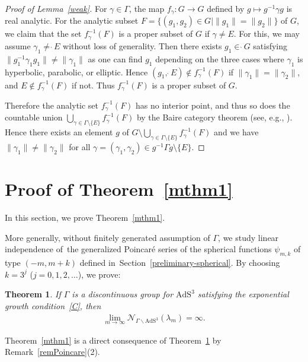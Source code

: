 \documentclass[11pt]{article}
\numberwithin{equation}{section}
\numberwithin{equation}{section}
\newtheorem{Theorem}{Theorem}[section]
\begin{document}
\begin{proof}[Proof of Lemma~\ref{weak}]
For $\gamma \in \Gamma$,
the map $f_{\gamma}\colon G \rightarrow G$ defined by $g\mapsto g^{-1}\gamma g$
is real analytic.
For the analytic subset
$F = \{(g_1,g_2) \in G
\mid \|g_1\| = \|g_2\| \}$ of $G$, we claim that
the set $f_{\gamma}^{-1}(F)$ is a proper subset of $G$ if $\gamma\neq E$.
For this, we may assume $\gamma_1 \neq \grave{\ }E$ without loss of generality.
Then there exists
$g_1 \in \grave{\ }G$ satisfying $\|g_1^{-1}\gamma_1g_1\| \neq \|
\gamma_1\|$ as one can find $g_{1}$ depending on the three cases where
$\gamma_{1}$ is hyperbolic, parabolic, or elliptic.
Hence $(g_1,\grave{\ }E)\notin f_{\gamma}^{-1}(F)$ if $\|\gamma_{1}\|=\|\gamma_{2}\|$,
and $E\notin f_{\gamma}^{-1}(F)$ if not. Thus $f_{\gamma}^{-1}(F)$ is a proper subset of $G$.

Therefore the analytic set
$f_{\gamma}^{-1}(F)$ has no interior point, and thus so does the countable union
$\bigcup_{\gamma \in \Gamma \setminus \{E\}}
 f_{\gamma}^{-1}(F)$ by the Baire category theorem
(see, e.g., \cite[Theorem~2.2]{functional-analysis}).
Hence there exists an element
$g$ of $G\setminus\bigcup_{\gamma \in \Gamma \setminus \{E\}}
 f_{\gamma}^{-1}(F)$ and we have
$\|\gamma_1\|\neq\|\gamma_2\|$
for all $\gamma=(\gamma_1,\gamma_2)\in
g^{-1}\Gamma g \setminus \{E\}$.
\end{proof}

\section{Proof of Theorem~\ref{mthm1}}\label{proof-linear-indep}
In this section, we prove Theorem~\ref{mthm1}.

More generally, without finitely generated assumption of $\Gamma$,
we study linear independence of~the generalized Poincar\'e series
of the spherical functions $\psi_{m,k}$ of type $(-m,m+k)$
defined in~Section~\ref{preliminary-spherical}.
By choosing $k=3^{j}$ ($j=0,1,2,\ldots$),
we prove:
\begin{Theorem}
\label{unbound}
If $\Gamma$ is a discontinuous group for $\mathrm{AdS}^{3}$ satisfying
the exponential growth condition~\eqref{C}, then
\begin{gather*}
\lim_{m\to\infty}\mathcal{N}_{\Gamma\backslash\mathrm{AdS}^{3}}(\lambda_{m})=\infty.
\end{gather*}
\end{Theorem}
Theorem~\ref{mthm1} is a direct consequence of
Theorem~\ref{unbound} by Remark~\ref{remPoincare}(2).
\end{document}
